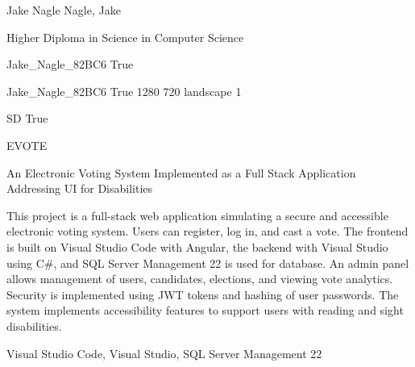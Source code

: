 \documentclass[twoside]{report}
\begin{document}
\begingroup{}\relax



\def\Key{Jake_Nagle_82BC6}

{Jake Nagle}
{Nagle, Jake}

{Higher Diploma in Science in Computer Science}

{Jake_Nagle_82BC6}
{True}

{Jake_Nagle_82BC6}
{True}
{1280}
{720}
{landscape}
{1}

{SD}
{True}

{EVOTE}

{An Electronic Voting System Implemented as a Full Stack Application Addressing UI for Disabilities}

{This project is a full-stack web application simulating a secure and accessible electronic voting system. Users can register, log in, and cast a vote. The frontend is built on Visual Studio Code with Angular, the backend with Visual Studio using C\#, and SQL Server Management 22 is used for database. An admin panel allows management of users, candidates, elections, and viewing vote analytics. Security is implemented using JWT tokens and hashing of user passwords. The system implements accessibility features to support users with reading and sight disabilities.}

{Visual Studio Code, Visual Studio, SQL Server Management 22}
\end{document}
